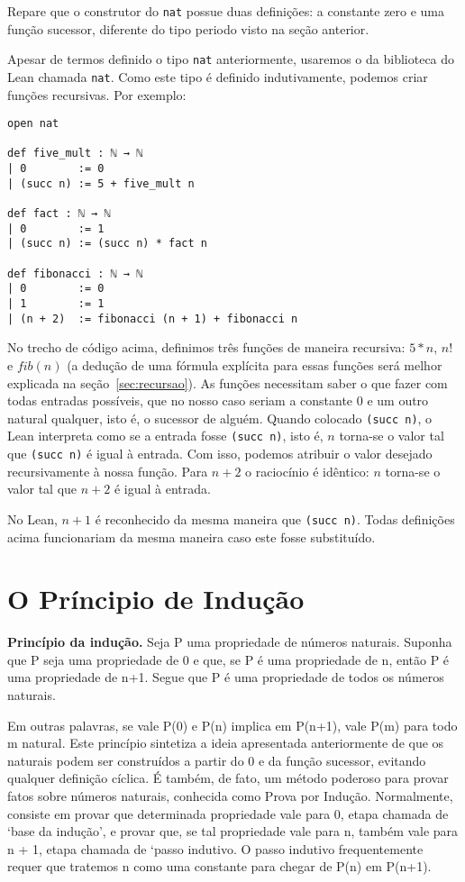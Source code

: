 Repare que o construtor do \lstinline{nat} possue duas definições: a constante zero e uma função sucessor, diferente do tipo periodo visto na seção anterior.

Apesar de termos definido o tipo \lstinline{nat} anteriormente, usaremos o da biblioteca do Lean chamada \lstinline{nat}. Como este tipo é definido indutivamente, podemos criar funções recursivas. Por exemplo:

\begin{lstlisting}
open nat

def five_mult : ℕ → ℕ
| 0        := 0
| (succ n) := 5 + five_mult n

def fact : ℕ → ℕ
| 0        := 1
| (succ n) := (succ n) * fact n

def fibonacci : ℕ → ℕ
| 0        := 0
| 1        := 1
| (n + 2)  := fibonacci (n + 1) + fibonacci n
\end{lstlisting}

No trecho de código acima, definimos três funções de maneira recursiva: $5*n$, $n!$ e $fib(n)$ (a dedução de uma fórmula explícita para essas funções será melhor explicada na seção~\ref{sec:recursao}). As funções necessitam saber o que fazer com todas entradas possíveis, que no nosso caso seriam a constante $0$ e um outro natural qualquer, isto é, o sucessor de alguém. Quando colocado \lstinline{(succ n)}, o Lean interpreta como se a entrada fosse \lstinline{(succ n)}, isto é, $n$ torna-se o valor tal que \lstinline{(succ n)} é igual à entrada. Com isso, podemos atribuir o valor desejado recursivamente à nossa função. Para $n+2$ o raciocínio é idêntico: $n$ torna-se o valor tal que $n+2$ é igual à entrada.

No Lean, $n + 1$ é reconhecido da mesma maneira que \lstinline{(succ n)}. Todas definições acima funcionariam da mesma maneira caso este fosse substituído. 

\section{O Príncipio de Indução}
\label{sec:inducao}

\textbf{Princípio da indução.} Seja P uma propriedade de números naturais. Suponha que P seja uma propriedade de 0 e que, se P é uma propriedade de n, então P é uma propriedade de n+1. Segue que P é uma propriedade de todos os números naturais.

Em outras palavras, se vale P(0) e P(n) implica em P(n+1), vale P(m) para todo m natural.
Este princípio sintetiza a ideia apresentada anteriormente de que os naturais podem ser construídos a partir do 0 e da função sucessor, evitando qualquer definição cíclica. É também, de fato, um método poderoso para provar fatos sobre números naturais, conhecida como Prova por Indução. Normalmente, consiste em provar que determinada propriedade vale para 0, etapa chamada de ‘base da indução’, e provar que, se tal propriedade vale para n, também vale para n + 1, etapa chamada de ‘passo indutivo. O passo indutivo frequentemente requer que tratemos n como uma constante para chegar de P(n) em P(n+1).


